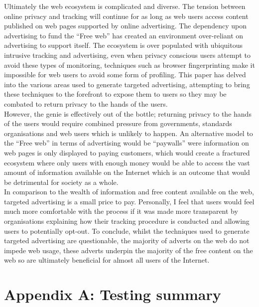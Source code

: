 \documentclass[12pt]{article}
\begin{document}
Ultimately the web ecosystem is complicated and diverse. The tension between online privacy and tracking will continue for as long as web users access content published on web pages supported by online advertising. The dependency upon advertising to fund the ``Free web'' has created an environment over-reliant on advertising to support itself. The ecosystem is over populated with ubiquitous intrusive tracking and advertising, even when privacy conscious users attempt to avoid these types of monitoring, techniques such as browser fingerprinting make it impossible for web users to avoid some form of profiling. This paper has delved into the various areas used to generate targeted advertising, attempting to bring these techniques to the forefront to expose them to users so they may be combated to return privacy to the hands of the users. \\

However, the genie is effectively out of the bottle; returning privacy to the hands of the users would require combined pressure from governments, standards organisations and web users which is unlikely to happen. An alternative model to the ``Free web'' in terms of advertising would be ``paywalls'' were information on web pages is only displayed to paying customers, which would create a fractured ecosystem where only users with enough money would be able to access the vast amount of information available on the Internet which is an outcome that would be detrimental for society as a whole. \\

In comparison to the wealth of information and free content available on the web, targeted advertising is a small price to pay. Personally, I feel that users would feel much more comfortable with the process if it was made more transparent by organisations explaining how their tracking procedure is conducted and allowing users to potentially opt-out. To conclude, whilst the techniques used to generate targeted advertising are questionable, the majority of adverts on the web do not impede web usage, these adverts underpin the majority of the free content on the web so are ultimately beneficial for almost all users of the Internet.

\section{Appendix A: Testing summary} \label{testSummary}
\end{document}
